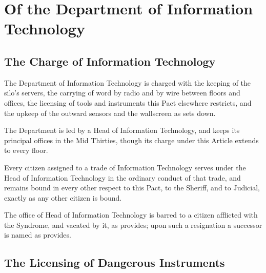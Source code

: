 \chapter{Of the Department of Information Technology}
\label{art:it}


\section{The Charge of Information Technology}
\label{sec:it:charge-of-information-technology}

The Department of Information Technology is charged with the keeping of the silo's servers, the carrying of word by radio and by wire between floors and offices, the licensing of tools and instruments this Pact elsewhere restricts, and the upkeep of the outward sensors and the wallscreen as  sets down.

\begin{clauses}
\item The Department is led by a Head of Information Technology, and keeps its principal offices in the Mid Thirties, though its charge under this Article extends to every floor.
\item Every citizen assigned to a trade of Information Technology serves under the Head of Information Technology in the ordinary conduct of that trade, and remains bound in every other respect to this Pact, to the Sheriff, and to Judicial, exactly as any other citizen is bound.
\item The office of Head of Information Technology is barred to a citizen afflicted with the Syndrome, and vacated by it, as  provides; upon such a resignation a successor is named as  provides.
\end{clauses}

\section{The Licensing of Dangerous Instruments}
\label{sec:it:licensing-of-dangerous-instruments}

